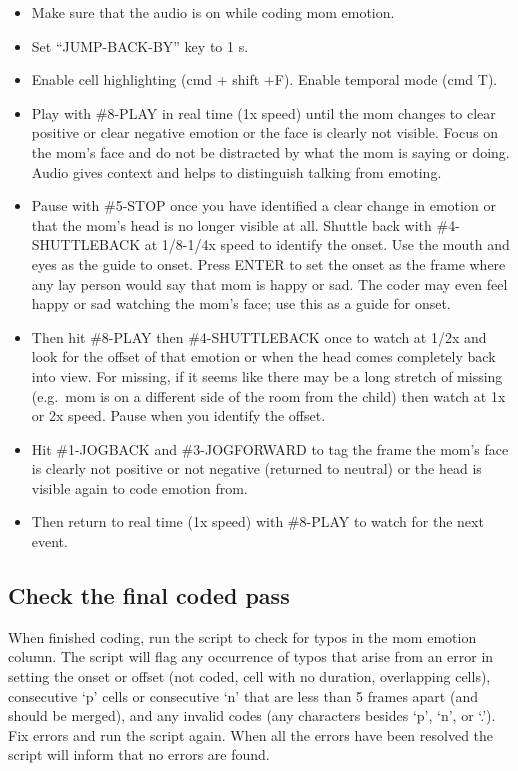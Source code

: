 \documentclass[
  12pt,
]{book}
\providecommand{\tightlist}{%
  \setlength{\itemsep}{0pt}\setlength{\parskip}{0pt}}
\begin{document}
\begin{itemize}
\tightlist
\item
  Make sure that the audio is on while coding mom emotion.
\item
  Set ``JUMP-BACK-BY'' key to 1 s.
\item
  Enable cell highlighting (cmd + shift +F). Enable temporal mode (cmd T).
\item
  Play with \#8-PLAY in real time (1x speed) until the mom changes to clear positive or clear negative emotion or the face is clearly not visible. Focus on the mom's face and do not be distracted by what the mom is saying or doing. Audio gives context and helps to distinguish talking from emoting.
\item
  Pause with \#5-STOP once you have identified a clear change in emotion or that the mom's head is no longer visible at all. Shuttle back with \#4-SHUTTLEBACK at 1/8-1/4x speed to identify the onset. Use the mouth and eyes as the guide to onset. Press ENTER to set the onset as the frame where any lay person would say that mom is happy or sad. The coder may even feel happy or sad watching the mom's face; use this as a guide for onset.
\item
  Then hit \#8-PLAY then \#4-SHUTTLEBACK once to watch at 1/2x and look for the offset of that emotion or when the head comes completely back into view. For missing, if it seems like there may be a long stretch of missing (e.g.~mom is on a different side of the room from the child) then watch at 1x or 2x speed. Pause when you identify the offset.
\item
  Hit \#1-JOGBACK and \#3-JOGFORWARD to tag the frame the mom's face is clearly not positive or not negative (returned to neutral) or the head is visible again to code emotion from.
\item
  Then return to real time (1x speed) with \#8-PLAY to watch for the next event.
\end{itemize}

\hypertarget{check-the-final-coded-pass-1}{%
\subsection{Check the final coded pass}\label{check-the-final-coded-pass-1}}

When finished coding, run the script to check for typos in the mom emotion column. The script will flag any occurrence of typos that arise from an error in setting the onset or offset (not coded, cell with no duration, overlapping cells), consecutive `p' cells or consecutive `n' that are less than 5 frames apart (and should be merged), and any invalid codes (any characters besides `p', `n', or `.'). Fix errors and run the script again. When all the errors have been resolved the script will inform that no errors are found.
\end{document}
